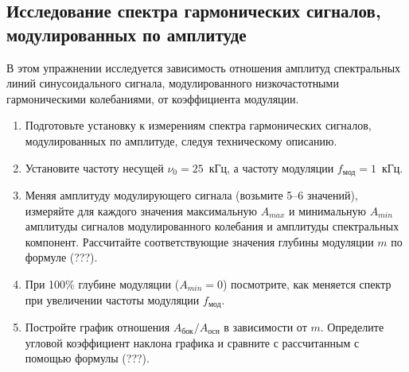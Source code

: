 \begin{lab:task}
\subsection*{Исследование спектра гармонических сигналов,
модулированных по амплитуде}

В этом упражнении исследуется зависимость отношения амплитуд спектральных линий синусоидального сигнала, модулированного низкочастотными гармоническими колебаниями, от коэффициента модуляции.

\begin{enumerate}
	\item Подготовьте установку к измерениям спектра гармонических сигналов, модулированных по амплитуде, следуя техническому описанию.
	\item Установите частоту несущей $\nu_0 = 25$~кГц, а частоту модуляции $f_{\text{мод}} = 1$~кГц.
	\item Меняя амплитуду модулирующего сигнала (возьмите 5--6 значений), измеряйте для каждого значения максимальную $A_{max}$ и минимальную $A_{min}$ амплитуды сигналов модулированного колебания и амплитуды спектральных компонент.  Рассчитайте соответствующие значения глубины модуляции $m$ по формуле (???).
	\item При 100\% глубине модуляции ($A_{min} = 0$) посмотрите, как меняется спектр при увеличении частоты модуляции $f_{\text{мод}}$.
	\item Постройте график отношения $A_{\text{бок}}/A_{\text{осн}}$ в зависимости от $m$. Определите угловой коэффициент наклона графика и сравните с рассчитанным с помощью формулы (???).
\end{enumerate}


\end{lab:task}
